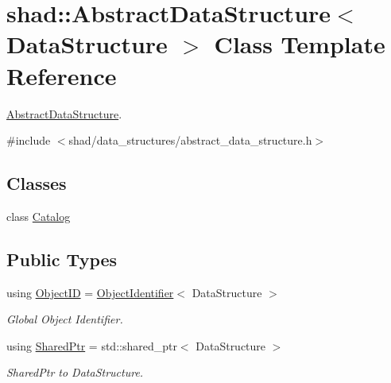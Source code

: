 \hypertarget{classshad_1_1AbstractDataStructure}{\section{shad\-:\-:Abstract\-Data\-Structure$<$ Data\-Structure $>$ Class Template Reference}
\label{classshad_1_1AbstractDataStructure}
}


\hyperlink{classshad_1_1AbstractDataStructure}{Abstract\-Data\-Structure}.  




{\ttfamily \#include $<$shad/data\-\_\-structures/abstract\-\_\-data\-\_\-structure.\-h$>$}

\subsection*{Classes}
\begin{DoxyCompactItemize}
\item 
class \hyperlink{classshad_1_1AbstractDataStructure_1_1Catalog}{Catalog}
\end{DoxyCompactItemize}
\subsection*{Public Types}
\begin{DoxyCompactItemize}
\item 
using \hyperlink{classshad_1_1AbstractDataStructure_a8772079d2686692828cfbf342cc2b594}{Object\-I\-D} = \hyperlink{classshad_1_1ObjectIdentifier}{Object\-Identifier}$<$ Data\-Structure $>$
\begin{DoxyCompactList}\small\item\em Global Object Identifier. \end{DoxyCompactList}\item 
using \hyperlink{classshad_1_1AbstractDataStructure_a8bb29450966955c546d40421ce46316f}{Shared\-Ptr} = std\-::shared\-\_\-ptr$<$ Data\-Structure $>$
\begin{DoxyCompactList}\small\item\em Shared\-Ptr to Data\-Structure. \end{DoxyCompactList}\end{DoxyCompactItemize}
